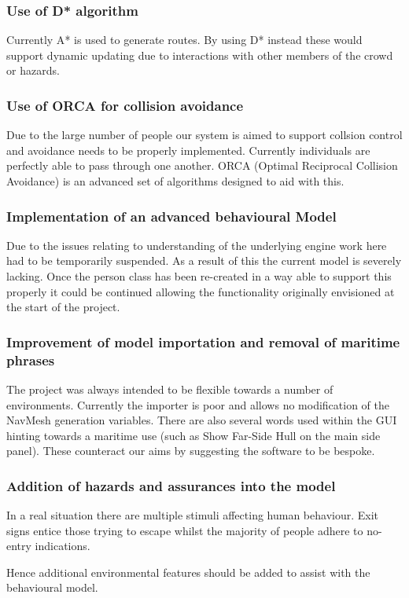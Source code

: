 \subsubsection{Use of D{*} algorithm}

Currently A{*} is used to generate routes. By using D{*} instead these
would support dynamic updating due to interactions with other members
of the crowd or hazards.


\subsubsection{Use of ORCA for collision avoidance}
\label{Problems:subsubsec:ORCA}

Due to the large number of people our system is aimed to support collsion
control and avoidance needs to be properly implemented. Currently
individuals are perfectly able to pass through one another. ORCA (Optimal
Reciprocal Collision Avoidance) is an advanced set of algorithms designed
to aid with this.


\subsubsection{Implementation of an advanced behavioural Model}

Due to the issues relating to understanding of the underlying engine
work here had to be temporarily suspended. As a result of this the
current model is severely lacking. Once the person class has been
re-created in a way able to support this properly it could be continued
allowing the functionality originally envisioned at the start of the
project.


\subsubsection{Improvement of model importation and removal of maritime phrases}

The project was always intended to be flexible towards a number of
environments. Currently the importer is poor and allows no modification
of the NavMesh generation variables. There are also several words
used within the GUI hinting towards a maritime use (such as Show Far-Side
Hull on the main side panel). These counteract our aims by suggesting
the software to be bespoke.


\subsubsection{Addition of hazards and assurances into the model}

In a real situation there are multiple stimuli affecting human behaviour.
Exit signs entice those trying to escape whilst the majority of people
adhere to no-entry indications.

Hence additional environmental features should be added to assist
with the behavioural model.



